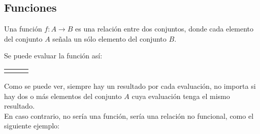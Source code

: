 \documentclass[Análisis.root.tex]{subfiles}
\begin{document}
    \subsection{Funciones}
        Una función $f: A \rightarrow B$ es una relación entre dos conjuntos, donde cada elemento del conjunto $A$ señala un sólo elemento del conjunto $B$.
        \begin{center}
        \end{center}
        Se puede evaluar la función así:
        \begin{center}
            \begin{tabularx}{\textwidth}{XXX}
                \centering{$f(1) = 4$} & \centering{$f(2) = 6$} & \centering{$f(3) = 6$}\\
            \end{tabularx}
        \end{center}
        Como se puede ver, siempre hay un resultado por cada evaluación, no importa si hay dos o más elementos del conjunto $A$ cuya evaluación tenga el mismo resultado.\\
        En caso contrario, no sería una función, sería una relación no funcional, como el siguiente ejemplo:
\end{document}
